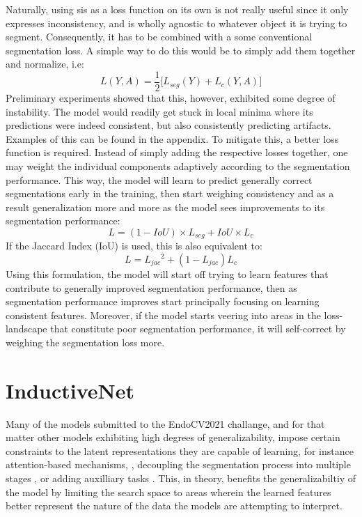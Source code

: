     Naturally, using \gls{sis} as a loss function on its own is not really useful since it only expresses inconsistency, and is wholly agnostic to whatever object it is trying to segment. Consequently, it has to be combined with a some conventional segmentation loss. A simple way to do this would be to simply add them together and normalize, i.e:
\begin{equation*}
    L(Y, A) = \frac{1}{2} \big[L_{seg}(Y)+L_c(Y,A)\big]
\end{equation*}
Preliminary experiments showed that this, however, exhibited some degree of instability. The model would readily get stuck in local minima where its predictions were indeed consistent, but also consistently predicting artifacts. Examples of this can be found in the appendix. To mitigate this, a better loss function is required. Instead of simply adding the respective losses together, one may weight the individual components adaptively according to the segmentation performance. This way, the model will learn to predict generally correct segmentations early in the training, then start weighing consistency and as a result generalization more and more as the model sees improvements to its segmentation performance:
    \begin{equation}
        L = (1-IoU)\times L_{seg} + IoU \times L_c
    \end{equation}
        If the Jaccard Index (IoU) is used, this is also equivalent to:
    \begin{equation}
        L = {L_{jac}}^2 + (1-L_{jac})L_c
    \end{equation}
Using this formulation, the model will start off trying to learn features that contribute to generally improved segmentation performance, then as segmentation performance improves start principally focusing on learning consistent features. Moreover, if the model starts veering into areas in the loss-landscape that constitute poor segmentation performance, it will self-correct by weighing the segmentation loss more. 

\section{InductiveNet}
Many of the models submitted to the EndoCV2021 challange, and for that matter other models exhibiting high degrees of generalizability, impose certain constraints to the latent representations they are capable of learning, for instance attention-based mechanisms, \cite{attention_generalizability}, decoupling the segmentation process into multiple stages \cite{doubleencdec}, or adding auxilliary tasks \cite{ddanet}. This, in theory, benefits the generalizabiltiy of the model by limiting the search space to areas wherein the learned features better represent the nature of the data the models are attempting to interpret. 


